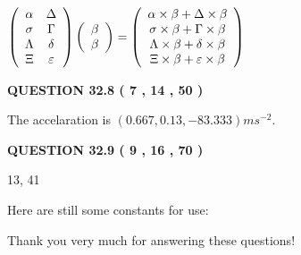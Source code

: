 \documentclass[12pt]{article}
\begin{document}
$  %
 \left( \begin{array}
 {
 c
 c
 }
 \alpha & 
 \Delta \\ 
 \sigma & 
 \Gamma \\ 
 \Lambda & 
 \delta \\ 
                    \Xi & 
 \varepsilon
 \end{array} \right)
 \left( \begin{array}
 {
 c
 }
 \beta \\ 
 \beta
 \end{array} \right)
=
 \left( \begin{array}
 {
 c
 }
  \alpha \times  \beta +  \Delta \times  \beta \\ 
  \sigma \times  \beta +  \Gamma \times  \beta \\ 
  \Lambda \times  \beta +  \delta \times  \beta \\ 
                     \Xi \times  \beta +  \varepsilon \times  \beta
 \end{array} \right)
$
 
 
 
  
\vspace{0.2in}
  
{\textbf{\Large{QUESTION
32.8 
 (           7 ,          14 ,          50 )
}}}
  
  
 
 
\noindent{}
 
 
  The accelaration is $  %
(
0.667,
0.13,
-83.333)
ms^{-2} $.
 
 
 
 
  
\vspace{0.2in}
  
{\textbf{\Large{QUESTION
32.9 
 (           9 ,          16 ,          70 )
}}}
  
  


 
 
\noindent{}

13,  %
41
 
 
 
   
   
 \vspace{0.2in}
Here are still some constants for use:
 
 
 
 
Thank you very much for answering these questions!
 
\end{document}
